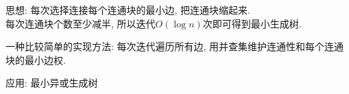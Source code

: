 思想: 每次选择连接每个连通块的最小边, 把连通块缩起来. \\
每次连通块个数至少减半, 所以迭代$O(\log n)$次即可得到最小生成树.

一种比较简单的实现方法: 每次迭代遍历所有边, 用并查集维护连通性和每个连通块的最小边权.

应用: 最小异或生成树